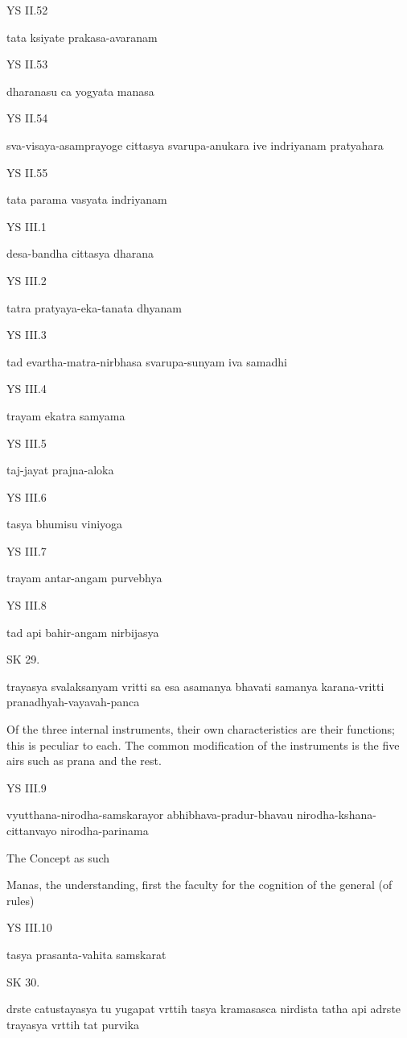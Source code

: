 YS II.52

    tata ksiyate prakasa-avaranam

YS II.53

    dharanasu ca yogyata manasa

YS II.54

    sva-visaya-asamprayoge cittasya svarupa-anukara ive indriyanam pratyahara

YS II.55

    tata parama vasyata indriyanam

YS III.1

    desa-bandha cittasya dharana

YS III.2

    tatra pratyaya-eka-tanata dhyanam

YS III.3

    tad evartha-matra-nirbhasa svarupa-sunyam iva samadhi

YS III.4

    trayam ekatra samyama

YS III.5

    taj-jayat prajna-aloka

YS III.6

    tasya bhumisu viniyoga

YS III.7

    trayam antar-angam purvebhya

YS III.8

    tad api bahir-angam nirbijasya

SK 29.

trayasya svalaksanyam vritti sa esa asamanya bhavati
samanya karana-vritti pranadhyah-vayavah-panca

Of the three internal instruments, their own characteristics are their functions;
this is peculiar to each.
The common modification of the instruments is the five airs
such as prana and the rest.

YS III.9

    vyutthana-nirodha-samskarayor abhibhava-pradur-bhavau nirodha-kshana-cittanvayo nirodha-parinama

    The Concept as such

    Manas, the understanding, first the faculty for the cognition of the general (of rules)

YS III.10

    tasya prasanta-vahita samskarat

SK 30.

drste catustayasya tu yugapat vrttih tasya kramasasca nirdista
tatha api adrste trayasya vrttih tat purvika

